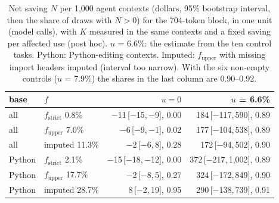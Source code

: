 \documentclass[11pt]{article}
\newcommand{\tci}[2]{\,{\scriptsize[#1,\,#2]}}
\begin{document}
\begin{table}[t]
\centering
\scriptsize
\setlength{\tabcolsep}{2pt}
\begin{tabular}{llrr}
\toprule
base & $f$ & $u = 0$ & $u$ = 6.6\% \\
\midrule
all & $f_\text{strict}$ 0.8\% & $-$11\tci{$-$15}{$-$9}, 0.00 & 184\tci{$-$117}{590}, 0.89 \\
all & $f_\text{upper}$ 7.0\% & $-$6\tci{$-$9}{$-$1}, 0.02 & 177\tci{$-$104}{538}, 0.89 \\
all & imputed 11.3\% & $-$2\tci{$-$6}{8}, 0.28 & 172\tci{$-$94}{502}, 0.90 \\
Python & $f_\text{strict}$ 2.1\% & $-$15\tci{$-$18}{$-$12}, 0.00 & 372\tci{$-$217}{1{,}002}, 0.89 \\
Python & $f_\text{upper}$ 17.7\% & $-$2\tci{$-$8}{5}, 0.27 & 324\tci{$-$172}{849}, 0.90 \\
Python & imputed 28.7\% & 8\tci{$-$2}{19}, 0.95 & 290\tci{$-$138}{739}, 0.91 \\
\bottomrule
\end{tabular}
\caption{Net saving $N$ per 1,000 agent contexts (dollars, 95\% bootstrap interval, then the share of draws with $N>0$) for the 704-token block, in one unit (model calls), with $K$ measured in the same contexts and a fixed saving per affected use (post hoc). $u$ = 6.6\%: the estimate from the ten control tasks. Python: Python-editing contexts. Imputed: $f_\text{upper}$ with missing import headers imputed (interval too narrow). With the six non-empty controls ($u$ = 7.9\%) the shares in the last column are 0.90--0.92.}
\label{tab:unified}
\end{table}
\end{document}
